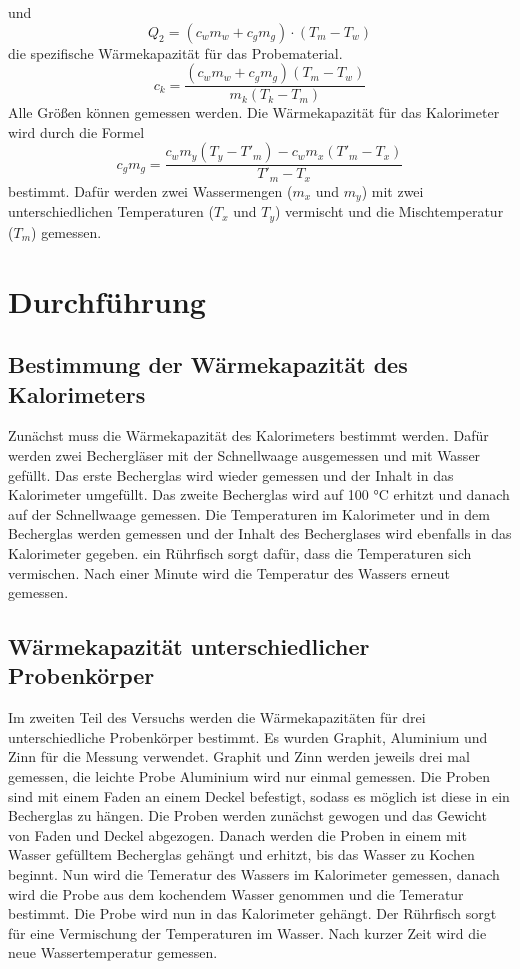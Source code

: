 und
\begin{equation*}
  Q_2 = (c_wm_w + c_gm_g)\cdot (T_m -T_w)
\end{equation*}
die spezifische Wärmekapazität für das Probematerial.
\begin{equation}
  c_k = \frac{(c_wm_w+c_gm_g)(T_m-T_w)}{m_k(T_k-T_m)}
  \label{eqn:Wärmekapazität}
\end{equation}
Alle Größen können gemessen werden.
Die Wärmekapazität für das Kalorimeter wird durch die Formel
\begin{equation}
  c_gm_g = \frac{c_wm_y(T_y -T'_m)-c_wm_x(T'_m - T_x)}{T'_m - T_x}
  \label{eqn:cm}
\end{equation}
bestimmt.
Dafür werden zwei Wassermengen ($m_x$ und $m_y$) mit zwei unterschiedlichen
Temperaturen ($T_x$ und $T_y$) vermischt und die Mischtemperatur ($T_m$) gemessen.

\section{Durchführung}
\subsection{Bestimmung der Wärmekapazität des Kalorimeters}

Zunächst muss die Wärmekapazität des Kalorimeters bestimmt werden.
Dafür werden zwei Bechergläser mit der Schnellwaage ausgemessen und mit Wasser gefüllt.
Das erste Becherglas wird wieder gemessen und der Inhalt in das Kalorimeter umgefüllt.
Das zweite Becherglas wird auf 100 °C erhitzt und danach auf der Schnellwaage gemessen.
Die Temperaturen im Kalorimeter und in dem Becherglas werden gemessen
und der Inhalt des Becherglases wird ebenfalls in das Kalorimeter gegeben.
ein Rührfisch sorgt dafür, dass die Temperaturen sich vermischen.
Nach einer Minute wird die Temperatur des Wassers erneut gemessen.
\subsection{Wärmekapazität unterschiedlicher Probenkörper}
Im zweiten Teil des Versuchs werden die Wärmekapazitäten für drei unterschiedliche Probenkörper bestimmt.
Es wurden Graphit, Aluminium und Zinn für die Messung verwendet.
Graphit und Zinn werden jeweils drei mal gemessen, die leichte Probe Aluminium wird nur einmal gemessen.
Die Proben sind mit einem Faden an einem Deckel befestigt,
sodass es möglich ist diese in ein Becherglas zu hängen.
Die Proben werden zunächst gewogen und das Gewicht von Faden und Deckel abgezogen.
Danach werden die Proben in einem mit Wasser gefülltem Becherglas gehängt und erhitzt,
bis das Wasser zu Kochen beginnt.
Nun wird die Temeratur des Wassers im Kalorimeter gemessen,
danach wird die Probe aus dem kochendem Wasser genommen und die Temeratur bestimmt.
Die Probe wird nun in das Kalorimeter gehängt.
Der Rührfisch sorgt für eine Vermischung der Temperaturen im Wasser.
Nach kurzer Zeit wird die neue Wassertemperatur gemessen.
